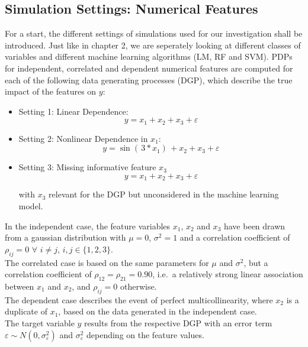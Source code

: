 \documentclass[]{krantz}
\providecommand{\tightlist}{%
  \setlength{\itemsep}{0pt}\setlength{\parskip}{0pt}}
\begin{document}
\subsection{Simulation Settings: Numerical
Features}\label{simulation-settings-numerical-features}

For a start, the different settings of simulations used for our
investigation shall be introduced. Just like in chapter 2, we are
seperately looking at different classes of variables and different
machine learning algorithms (LM, RF and SVM). PDPs for independent,
correlated and dependent numerical features are computed for each of the
following data generating processes (DGP), which describe the true
impact of the features on \(y\):

\begin{itemize}
\tightlist
\item
  Setting 1: Linear Dependence:\\

  \begin{equation}
  y = x_1 + x_2 + x_3 + \varepsilon \label{eq:10}
  \end{equation}
\item
  Setting 2: Nonlinear Dependence in \(x_1\):\\

  \begin{equation}
  y = \sin{( \, 3*x_1 ) \,} + x_2 + x_3 + \varepsilon \label{eq:11}
  \end{equation}
\item
  Setting 3: Missing informative feature \(x_3\)\\

  \begin{equation}
  y = x_1 + x_2 + x_3 + \varepsilon \label{eq:12}
  \end{equation}

  with \(x_3\) relevant for the DGP but unconsidered in the machine
  learning model.
\end{itemize}

In the independent case, the feature variables \(x_1\), \(x_2\) and
\(x_3\) have been drawn from a gaussian distribution with \(\mu = 0\),
\(\sigma^2 = 1\) and a correlation coefficient of \(\rho_{ij} = 0\)
\(\forall\) \(i \ne j\), \(i,j \in \{1,2,3\}\).\\
The correlated case is based on the same parameters for \(\mu\) and
\(\sigma^2\), but a correlation coefficient of
\(\rho_{12} = \rho_{21} = 0.90\), i.e.~a relatively strong linear
association between \(x_1\) and \(x_2\), and \(\rho_{ij} = 0\)
otherwise.\\
The dependent case describes the event of perfect multicollinearity,
where \(x_2\) is a duplicate of \(x_1\), based on the data generated in
the independent case.\\
The target variable \(y\) results from the respective DGP with an error
term \(\varepsilon \sim N(0, \sigma^2_\varepsilon)\) and
\(\sigma^2_\varepsilon\) depending on the feature values.
\end{document}
